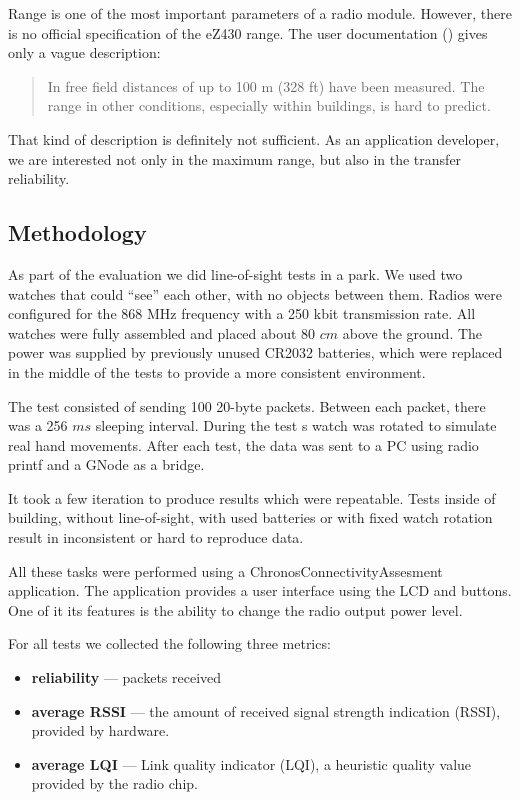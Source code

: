 Range is one of the most important parameters of a radio module.
However, there is no official specification of the eZ430 range.
The user documentation (\cite{eZ430Chronos}) gives only a vague description:
\begin{quote}
In free field distances of up to 100 m (328 ft) have been measured. The range in other conditions,
especially within buildings, is hard to predict.
\end{quote}

That kind of description is definitely not sufficient.
As an application developer, we are interested not only in the maximum range, but also in the transfer reliability.


\subsection{Methodology}

As part of the evaluation we did line-of-sight tests in a park.
We used two watches that could ``see'' each other, with no objects between them.
Radios were configured for the 868 MHz frequency with a 250 kbit transmission rate.
All watches were fully assembled and placed about 80 $ cm $ above the ground.
The power was supplied by previously unused CR2032 batteries, which were replaced in the middle of the tests to provide a more consistent environment.

The test consisted of sending 100 20-byte packets.
Between each packet, there was a 256 $ ms $ sleeping interval.
During the test s watch was rotated to simulate real hand movements.
After each test, the data was sent to a PC using radio printf and a GNode as a bridge.

It took a few iteration to produce results which were repeatable.
Tests inside of building, without line-of-sight, with used batteries or with fixed watch rotation result in inconsistent or hard to reproduce data.

All these tasks were performed using a ChronosConnectivityAssesment application.
The application provides a user interface using the LCD and buttons.
One of it its features is the ability to change the radio output power level.

For all tests we collected the following three metrics:
\begin{itemize}
  \item \textbf{reliability} --- packets received
  \item \textbf{average RSSI} --- the amount of received signal strength indication (RSSI), provided by hardware.
  \item \textbf{average LQI} --- Link quality indicator (LQI), a heuristic quality value provided by the radio chip.
\end{itemize}

